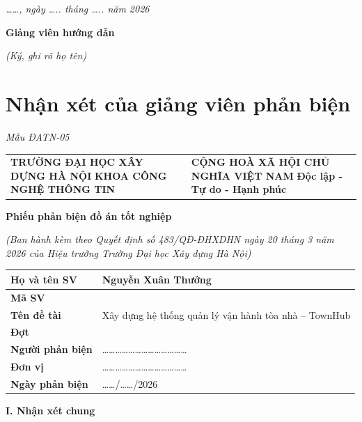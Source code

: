 \textit{\ldots{}\ldots{}, ngày \ldots{}.. tháng \ldots{}.. năm 2026}

\textbf{Giảng viên hướng dẫn}

\textit{(Ký, ghi rõ họ tên)}

\chapter*{Nhận xét của giảng viên phản biện}
\textit{Mẫu ĐATN-05}

\begin{center}{\singlespacing\renewcommand{\arraystretch}{1.2}
\begin{tabular}{>{\raggedright\arraybackslash}p{}>{\centering\arraybackslash}p{}}
\textbf{TRƯỜNG ĐẠI HỌC XÂY DỰNG HÀ NỘI} \newline \textbf{KHOA CÔNG NGHỆ THÔNG TIN} & \textbf{CỘNG HOÀ XÃ HỘI CHỦ NGHĨA VIỆT NAM} \newline \textbf{Độc lập - Tự do - Hạnh phúc} \\
\end{tabular}}\end{center}
\textbf{Phiếu phản biện đồ án tốt nghiệp}

\textit{(Ban hành kèm theo Quyết định số 483/QĐ-ĐHXDHN ngày 20 tháng 3 năm 2026 của Hiệu trưởng Trường Đại học Xây dựng Hà Nội)}

\begin{center}{\singlespacing\renewcommand{\arraystretch}{1.25}
\begin{tabular}{|>{\raggedright\arraybackslash}p{}|>{\raggedright\arraybackslash}p{}|}
\hline
\textbf{Họ và tên SV} & Nguyễn Xuân Thưởng \\ \hline
\textbf{Mã SV} & 0220766 \\ \hline
\textbf{Tên đề tài} & Xây dựng hệ thống quản lý vận hành tòa nhà – TownHub \\ \hline
\textbf{Đợt} & 2026 \\ \hline
\textbf{Người phản biện} & \ldots{}\ldots{}\ldots{}\ldots{}\ldots{}\ldots{}\ldots{}\ldots{}\ldots{}\ldots{}\ldots{}\ldots{}\ldots{} \\ \hline
\textbf{Đơn vị} & \ldots{}\ldots{}\ldots{}\ldots{}\ldots{}\ldots{}\ldots{}\ldots{}\ldots{}\ldots{}\ldots{}\ldots{}\ldots{} \\ \hline
\textbf{Ngày phản biện} & \ldots{}\ldots{}/\ldots{}\ldots{}/2026 \\ \hline
\end{tabular}}\end{center}
\textbf{I. Nhận xét chung}

